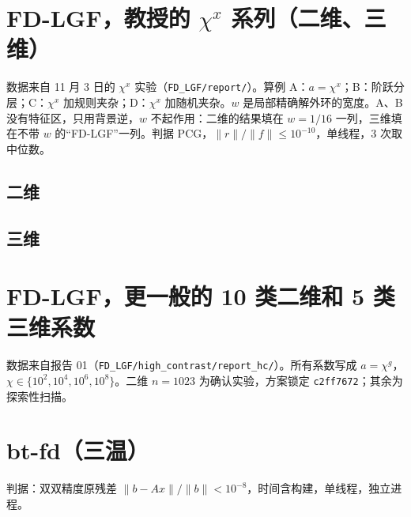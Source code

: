 \section{FD-LGF，教授的 $\chi^x$ 系列（二维、三维）}
数据来自 11 月 3 日的 $\chi^x$ 实验（\texttt{FD\_LGF/report/}）。算例 A：$a=\chi^x$；B：阶跃分层；C：$\chi^x$ 加规则夹杂；D：$\chi^x$ 加随机夹杂。$w$ 是局部精确解外环的宽度。A、B 没有特征区，只用背景逆，$w$ 不起作用：二维的结果填在 $w=1/16$ 一列，三维填在不带 $w$ 的“FD-LGF”一列。判据 PCG，$\|r\|/\|f\|\le10^{-10}$，单线程，3 次取中位数。
\subsection{二维}

\subsection{三维}

\FloatBarrier
\section{FD-LGF，更一般的 10 类二维和 5 类三维系数}
数据来自报告 01（\texttt{FD\_LGF/high\_contrast/report\_hc/}）。所有系数写成 $a=\chi^g$，$\chi\in\{10^2,10^4,10^6,10^8\}$。二维 $n=1023$ 为确认实验，方案锁定 \texttt{c2ff7672}；其余为探索性扫描。


\FloatBarrier
\section{bt-fd（三温）}
判据：双双精度原残差 $\|b-Ax\|/\|b\|<10^{-8}$，时间含构建，单线程，独立进程。
